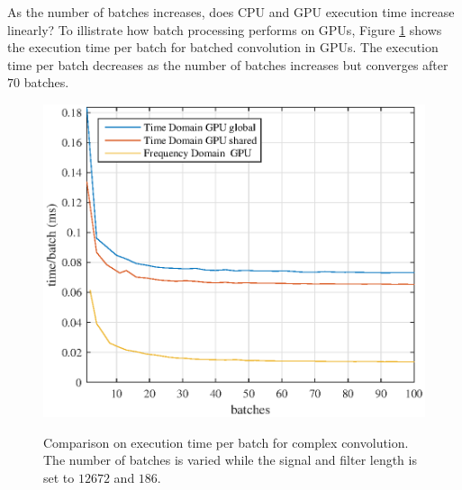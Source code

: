 As the number of batches increases, does CPU and GPU execution time increase linearly?
To illistrate how batch processing performs on GPUs, Figure \ref{fig:CPUvsGPU_varyBatches_186taps_12672signal_timePerBatch} shows the execution time per batch for batched convolution in GPUs.
The execution time per batch decreases as the number of batches increases but converges after $70$ batches.
\begin{figure}
	\caption{Comparison on execution time per batch for complex convolution. The number of batches is varied while the signal and filter length is set to $12672$ and $186$.}
	\centering\includegraphics[width=5in]{figures/gpu_intro/CPUvsGPU_varyBatches_186taps_12672signal_timePerBatch.eps}
	\label{fig:CPUvsGPU_varyBatches_186taps_12672signal_timePerBatch}
\end{figure}


